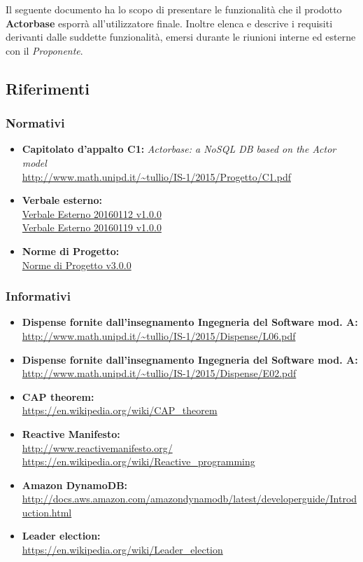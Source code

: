 \documentclass{scalatekids-article}
\begin{document}
Il seguente documento ha lo scopo di presentare le funzionalità che il prodotto
\textbf{Actorbase} esporrà all'utilizzatore finale. Inoltre elenca e descrive i
requisiti derivanti dalle suddette funzionalità, emersi durante le riunioni
interne ed esterne con il \textit{Proponente}.
\prodPurpose{}\glossExpl{}

\subsection{Riferimenti}

\subsubsection{Normativi}

\begin{itemize}
\item\textbf{Capitolato d'appalto C1:} \textit{Actorbase: a NoSQL DB based on the Actor model}\\
  \url{http://www.math.unipd.it/~tullio/IS-1/2015/Progetto/C1.pdf}
\item\textbf{Verbale esterno:}\\
  \href{run:../RR/Interni/VerbaleEsterno20160112\_v1.0.0.pdf}{Verbale Esterno 20160112 v1.0.0}\\
  \href{run:../RR/Interni/VerbaleEsterno20160119\_v1.0.0.pdf}{Verbale Esterno 20160119 v1.0.0}
\item\textbf{Norme di Progetto:}\\
  \href{run:../Interni/NormeDiProgetto\_v3.0.0.pdf}{Norme di Progetto v3.0.0}
\end{itemize}

\subsubsection{Informativi}

\begin{itemize}
\item\textbf{Dispense fornite dall'insegnamento Ingegneria del Software mod. A:}\\
  \url{http://www.math.unipd.it/~tullio/IS-1/2015/Dispense/L06.pdf}
\item\textbf{Dispense fornite dall'insegnamento Ingegneria del Software mod. A:}\\
  \url{http://www.math.unipd.it/~tullio/IS-1/2015/Dispense/E02.pdf}
\item\textbf{CAP theorem:}\\
  \url{https://en.wikipedia.org/wiki/CAP_theorem}
\item\textbf{Reactive Manifesto:}\\
  \url{http://www.reactivemanifesto.org/}\\
  \url{https://en.wikipedia.org/wiki/Reactive_programming}
\item\textbf{Amazon DynamoDB:}\\
  \url{http://docs.aws.amazon.com/amazondynamodb/latest/developerguide/Introduction.html}
\item\textbf{Leader election:}\\
  \url{https://en.wikipedia.org/wiki/Leader_election}
\end{itemize}
\end{document}

